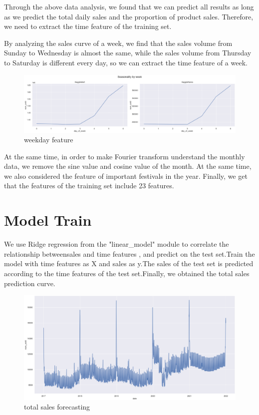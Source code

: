 Through the above data analysis, we found that we can predict all results as long as we predict the total daily sales and the proportion of product sales. Therefore, we need to extract the time feature of the training set.

By analyzing the sales curve of a week, we find that the sales volume from Sunday to Wednesday is almost the same, while the sales volume from Thursday to Saturday is different every day, so we can extract the time feature of a week.

	\begin{figure}[H]
	\centering
	\includegraphics[scale=0.25]{week-feature.eps}
	\caption{weekday feature}\label{fig:OutAspect-target}
\end{figure}
At the same time, in order to make Fourier transform understand the monthly data, we remove the sine value and cosine value of the month. At the same time, we also considered the feature of important festivals in the year. Finally, we get that the features of the training set include 23 features.

\section{Model Train} \label{sec-experiment}
We use Ridge regression from the "linear_model" module to correlate the relationship betweensales and time features , and predict on the test set.Train the model with time features as X and sales as y.The sales of the test set is predicted according to the time features of the test set.Finally, we obtained the total sales prediction curve.

\begin{figure}[H]
	\centering
	\includegraphics[scale=0.3]{total-sales.eps}
	\caption{total sales forecasting}\label{fig:OutAspect-target}
\end{figure}

